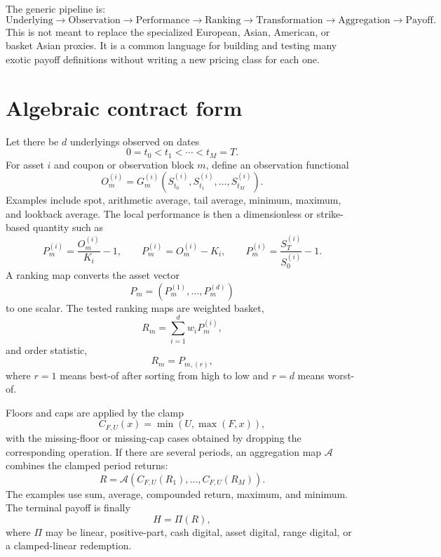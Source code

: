 \documentclass[11pt,oneside]{book}
\theoremstyle{definition}
\begin{document}
The generic pipeline is:
\[
  \text{Underlying}
  \longrightarrow
  \text{Observation}
  \longrightarrow
  \text{Performance}
  \longrightarrow
  \text{Ranking}
  \longrightarrow
  \text{Transformation}
  \longrightarrow
  \text{Aggregation}
  \longrightarrow
  \text{Payoff}.
\]
This is not meant to replace the specialized European, Asian, American, or
basket Asian proxies. It is a common language for building and testing many
exotic payoff definitions without writing a new pricing class for each one.

\section{Algebraic contract form}
Let there be \(d\) underlyings observed on dates
\[
  0=t_0<t_1<\cdots<t_M=T.
\]
For asset \(i\) and coupon or observation block \(m\), define an observation
functional
\[
  O_m^{(i)}
  =
  G_m^{(i)}
  \left(
    S_{t_0}^{(i)},S_{t_1}^{(i)},\ldots,S_{t_M}^{(i)}
  \right).
\]
Examples include spot, arithmetic average, tail average, minimum, maximum, and
lookback average. The local performance is then a dimensionless or strike-based
quantity such as
\[
  P_m^{(i)}=\frac{O_m^{(i)}}{K_i}-1,
  \qquad
  P_m^{(i)}=O_m^{(i)}-K_i,
  \qquad
  P_m^{(i)}=\frac{S_T^{(i)}}{S_0^{(i)}}-1.
\]
A ranking map converts the asset vector
\[
  P_m=\left(P_m^{(1)},\ldots,P_m^{(d)}\right)
\]
to one scalar. The tested ranking maps are weighted basket,
\[
  R_m=\sum_{i=1}^d w_i P_m^{(i)},
\]
and order statistic,
\[
  R_m=P_{m,(r)},
\]
where \(r=1\) means best-of after sorting from high to low and \(r=d\) means
worst-of.

Floors and caps are applied by the clamp
\[
  C_{F,U}(x)=\min(U,\max(F,x)),
\]
with the missing-floor or missing-cap cases obtained by dropping the
corresponding operation. If there are several periods, an aggregation map
\(\mathcal A\) combines the clamped period returns:
\[
  R
  =
  \mathcal A\left(C_{F,U}(R_1),\ldots,C_{F,U}(R_M)\right).
\]
The examples use sum, average, compounded return, maximum, and minimum. The
terminal payoff is finally
\[
  H=\Pi(R),
\]
where \(\Pi\) may be linear, positive-part, cash digital, asset digital, range
digital, or a clamped-linear redemption.
\end{document}
